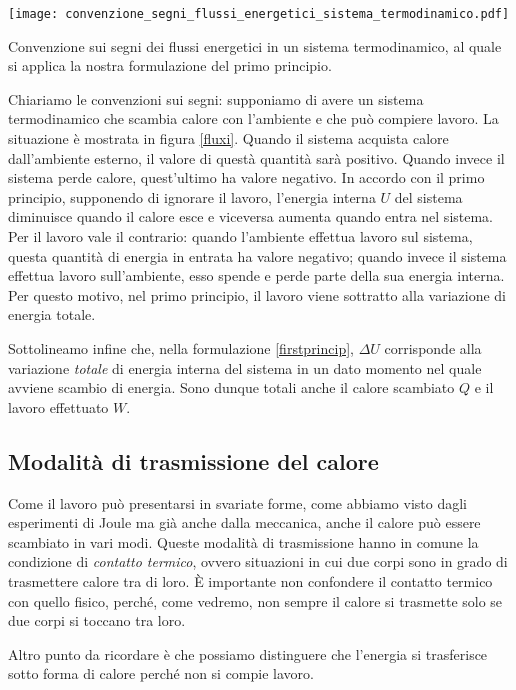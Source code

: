 \begin{marginfigure}
    \centering
    \texttt{[image: convenzione\_segni\_flussi\_energetici\_sistema\_termodinamico.pdf]}
    \caption{Convenzione sui segni dei flussi energetici in un
    sistema termodinamico, al quale si applica la nostra
    formulazione del primo principio.}\label{fluxi}
\end{marginfigure}

Chiariamo le convenzioni sui segni: supponiamo di avere un sistema
termodinamico che scambia calore con l'ambiente e che può compiere
lavoro. La situazione è mostrata in figura \ref{fluxi}.
Quando il sistema acquista calore dall'ambiente esterno,
il valore di questà quantità sarà positivo. Quando invece il
sistema perde calore, quest'ultimo ha valore negativo. In accordo
con il primo principio, supponendo di ignorare il lavoro, l'energia
interna $U$ del sistema diminuisce quando il calore esce e viceversa
aumenta quando entra nel sistema.
Per il lavoro vale il contrario: quando l'ambiente effettua lavoro
sul sistema, questa quantità di energia in entrata ha valore negativo;
quando invece il sistema effettua lavoro sull'ambiente, esso spende
e perde parte della sua energia interna. Per questo motivo, nel
primo principio, il lavoro viene sottratto alla variazione di energia
totale.

Sottolineamo infine che, nella formulazione \ref{firstprincip},
$\Delta U$ corrisponde alla variazione \textit{totale} di energia
interna del sistema in un dato momento nel quale avviene scambio
di energia. Sono dunque totali anche il calore scambiato
$Q$ e il lavoro effettuato $W$.


\subsection{Modalità di trasmissione del calore}
Come il lavoro può presentarsi in svariate forme, come abbiamo
visto dagli esperimenti di Joule ma già anche dalla meccanica,
anche il calore può essere scambiato in vari modi. Queste modalità
di trasmissione hanno in comune la condizione di \textit{contatto
termico}, ovvero situazioni in cui due corpi sono in grado di
trasmettere calore tra di loro. È importante non confondere il
contatto termico con quello fisico, perché, come vedremo, non
sempre il calore si trasmette solo se due corpi si toccano tra loro.

Altro punto da ricordare è che possiamo distinguere che l'energia
si trasferisce sotto forma di calore perché non si compie lavoro.

